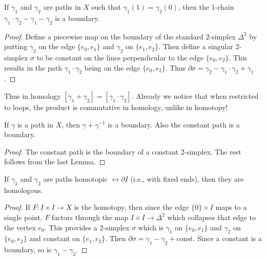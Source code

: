 \begin{lem}
    If $\gamma_1$ and $\gamma_2$ are paths in $X$ such that $\gamma_1(1)=\gamma_2(0)$, then the 1-chain $\gamma_1\cdot\gamma_2-\gamma_1-\gamma_2$ is a boundary.
\end{lem}
\begin{proof}
     Define a piecewise map on the boundary of the standard 2-simplex $\Delta^2$ by putting $\gamma_2$ on the edge $\{e_0,e_1\}$ and $\gamma_2$ on $\{e_1,e_2\}$. Then define a singular 2-simplex $\sigma$ to be constant on the lines perpendicular to the edge $\{e_0,e_2\}$. This results in the path $\gamma_1\cdot\gamma_2$ being on the edge $\{e_0,e_2\}$. Thus $\partial\sigma=\gamma_2-\gamma_1\cdot\gamma_2+\gamma_1$.
\end{proof}

Thus in homology $[\gamma_1+\gamma_2]=[\gamma_1\cdot\gamma_2]$. Already we notice that when restricted to loops, the product is commutative in homology, unlike in homotopy!

\begin{lem}
    If $\gamma$ is a path in $X$, then $\gamma+\gamma^{-1}$ is a boundary. Also the constant path is a boundary.
\end{lem}
\begin{proof}
     The constant path is the boundary of a constant 2-simplex. The rest follows from the last Lemma.
\end{proof}

\begin{lem}
    If $\gamma_1$ and $\gamma_2$ are paths homotopic $\rel \partial I$ (i.e., with fixed ends), then they are homologous.
\end{lem}
\begin{proof}
     If $F:I\times I\to X$ is the homotopy, then since the edge $\{0\}\times I$ maps to a single point, $F$ factors through the map $I\times I\to \Delta^2$ which collapses that edge to the vertex $e_0$. This provides a 2-simplex $\sigma$ which is $\gamma_1$ on $\{e_0,e_1\}$ and $\gamma_2$ on $\{e_0,e_2\}$ and constant on $\{e_1,e_2\}$. Then $\partial\sigma=\gamma_1-\gamma_2+\text{const}$. Since a constant is a boundary, so is $\gamma_1-\gamma_2$.
\end{proof}

